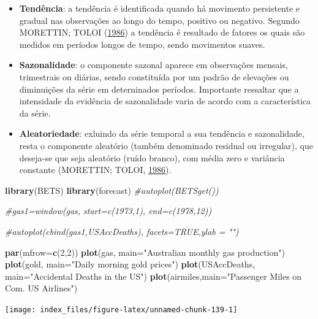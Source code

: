 \documentclass[12pt,brazil,oneside]{book}
\newenvironment{Shaded}{\begin{snugshade}}{\end{snugshade}}
\newcommand{\CommentTok}[1]{\textcolor[rgb]{0.56,0.35,0.01}{\textit{#1}}}
\newcommand{\DataTypeTok}[1]{\textcolor[rgb]{0.13,0.29,0.53}{#1}}
\newcommand{\DecValTok}[1]{\textcolor[rgb]{0.00,0.00,0.81}{#1}}
\newcommand{\KeywordTok}[1]{\textcolor[rgb]{0.13,0.29,0.53}{\textbf{#1}}}
\newcommand{\NormalTok}[1]{#1}
\newcommand{\StringTok}[1]{\textcolor[rgb]{0.31,0.60,0.02}{#1}}
\begin{document}
\begin{itemize}
\item
  \textbf{Tendência}: a tendência é identificada quando há movimento persistente e gradual nas observações ao longo do tempo, positivo ou negativo. Segundo MORETTIN; TOLOI (\protect\hyperlink{ref-morettin1986}{1986}) a tendência é resultado de fatores os quais são medidos em períodos longos de tempo, sendo movimentos suaves.
\item
  \textbf{Sazonalidade}: o componente sazonal aparece em observações mensais, trimestrais ou diárias, sendo constituída por um padrão de elevações ou diminuições da série em deterninados períodos. Importante ressaltar que a intensidade da evidência de sazonalidade varia de acordo com a característica da série.
\item
  \textbf{Aleatoriedade}: exluindo da série temporal a sua tendência e sazonalidade, resta o componente aleatório (também denominado residual ou irregular), que deseja-se que seja aleatório (ruído branco), com média zero e variância constante (MORETTIN; TOLOI, \protect\hyperlink{ref-morettin1986}{1986}).
\end{itemize}

\begin{Shaded}
\begin{Highlighting}[]
\KeywordTok{library}\NormalTok{(BETS)}
\KeywordTok{library}\NormalTok{(forecast)}
\CommentTok{#autoplot(BETSget())}

\CommentTok{#gas1=window(gas, start=c(1973,1), end=c(1978,12))}

\CommentTok{#autoplot(cbind(gas1,USAccDeaths), facets=TRUE,ylab = "")}

\KeywordTok{par}\NormalTok{(}\DataTypeTok{mfrow=}\KeywordTok{c}\NormalTok{(}\DecValTok{2}\NormalTok{,}\DecValTok{2}\NormalTok{))}
\KeywordTok{plot}\NormalTok{(gas, }\DataTypeTok{main=}\StringTok{"Australian monthly gas production"}\NormalTok{)}
\KeywordTok{plot}\NormalTok{(gold, }\DataTypeTok{main=}\StringTok{"Daily morning gold prices"}\NormalTok{)}
\KeywordTok{plot}\NormalTok{(USAccDeaths, }\DataTypeTok{main=}\StringTok{"Accidental Deaths in the US"}\NormalTok{)}
\KeywordTok{plot}\NormalTok{(airmiles,}\DataTypeTok{main=}\StringTok{"Passenger Miles on Com. US Airlines"}\NormalTok{)}
\end{Highlighting}
\end{Shaded}

\begin{center}\texttt{[image: index\_files/figure-latex/unnamed-chunk-139-1]} \end{center}
\end{document}
